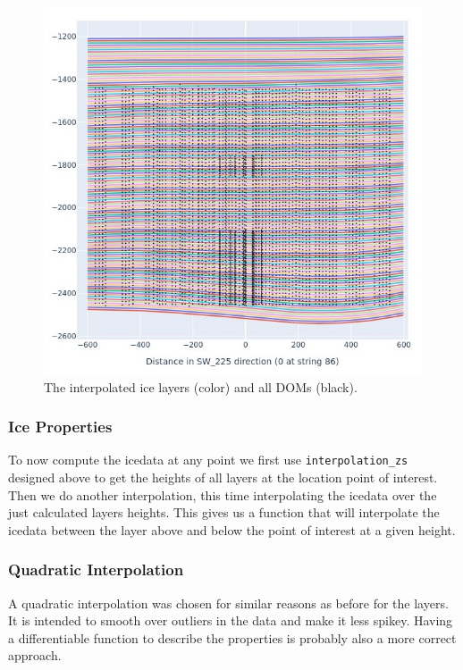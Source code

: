 \documentclass[a4paper,10pt]{scrartcl}
\begin{document}
\begin{figure}[H]
    \includegraphics[scale=0.6]{images/layers_2d.jpg}
    \centering
    \caption{The interpolated ice layers (color) and all DOMs (black).}
    \label{fig:layers_2d}
\end{figure}

\subsubsection{Ice Properties}

To now compute the icedata at any point we first use \texttt{interpolation\_zs} designed above to get the heights of all layers at the location point of interest.
Then we do another interpolation, this time interpolating the icedata over the just calculated layers heights.
This gives us a function that will interpolate the icedata between the layer above and below the point of interest at a given height.

\subsubsection*{Quadratic Interpolation}

A quadratic interpolation was chosen for similar reasons as before for the layers.
It is intended to smooth over outliers in the data and make it less spikey.
Having a differentiable function to describe the properties is probably also a more correct approach.
\end{document}
